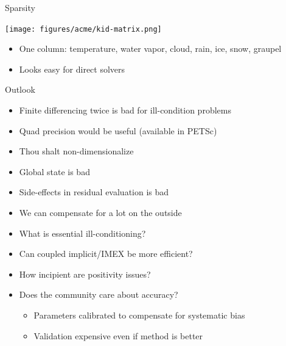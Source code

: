 \documentclass{beamer}
\begin{document}
\begin{frame}{Sparsity}
  \begin{center}
    \texttt{[image: figures/acme/kid-matrix.png]}
  \end{center}
  \begin{itemize}
  \item One column: temperature, water vapor, cloud, rain, ice, snow, graupel
  \item Looks easy for direct solvers
  \end{itemize}
\end{frame}

\begin{frame}{Outlook}
  \begin{itemize}
  \item Finite differencing twice is bad for ill-condition problems
  \item Quad precision would be useful (available in PETSc)
  \item Thou shalt non-dimensionalize
  \item Global state is bad
  \item Side-effects in residual evaluation is bad
  \item We can compensate for a lot on the outside
  \item What is essential ill-conditioning?
  \item Can coupled implicit/IMEX be more efficient?
  \item How incipient are positivity issues?
  \item Does the community care about accuracy?
    \begin{itemize}
    \item Parameters calibrated to compensate for systematic bias
    \item Validation expensive even if method is better
    \end{itemize}
  \end{itemize}
\end{frame}
\end{document}
